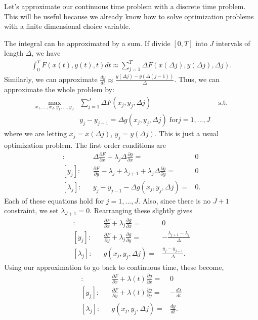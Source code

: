 Let's approximate our continuous time problem with a discrete time
problem. This will be useful because we already know how to solve
optimization problems with a finite dimensional choice variable. 

The integral can be approximated by a sum. If divide $[0,T]$ into $J$
intervals of length $\Delta$, we have
\begin{align*}
  \int_0^T F(x(t),y(t),t) dt \approx \sum_{j=1}^T \Delta F(x(\Delta
  j), y(\Delta j) , \Delta j).
\end{align*}
Similarly, we can approximate $\frac{dy}{dt} \approx \frac{y(\Delta j)
  - y(\Delta(j-1))}{\Delta}$. 
Thus, we can approximate the whole problem by:
\begin{align*}
  \max_{x_1, ..., x_J, y_1, ..., y_J} & \sum_{j=1}^J \Delta F(x_j,
  y_j,\Delta j) 
  & \text{ s.t.} \\
  & y_j - y_{j-1} = \Delta g(x_j,y_j,\Delta j) \text{ for} j = 1,...,J
\end{align*}
where we are letting $x_j = x(\Delta j)$, $y_j = y(\Delta j)$. This is
just a usual optimization problem. The first order conditions are
\begin{align*}
  [x_j]: &&  \Delta \frac{\partial F}{\partial x} + \lambda_j \Delta
  \frac{\partial g}{\partial x} = & 0 \\
  [y_j]: &&  \frac{\partial F}{\partial y} - \lambda_j + \lambda_{j+1}
  + \lambda_j \Delta
  \frac{\partial g}{\partial y} = & 0 \\
  [\lambda_j]: && y_j - y_{j-1} - \Delta g(x_j,y_j,\Delta j) = & 0 .
\end{align*}
Each of these equations hold for $j = 1,..., J$. Also, since there is
no $J+1$ constraint, we set $\lambda_{J+1}=0$. Rearranging these
slightly gives
\begin{align*}
  [x_j]: &&  \frac{\partial F}{\partial x} + \lambda_j \frac{\partial
    g}{\partial x} = & 0 \\ 
  [y_j]: &&  \frac{\partial F}{\partial y} + \lambda_j 
  \frac{\partial g}{\partial y} = & -\frac{\lambda_{j+1} -
    \lambda_j}{\Delta} \\
  [\lambda_j]: && g(x_j,y_j,\Delta j) = & \frac{y_j - y_{j-1}}{\Delta}.
\end{align*}
Using our approximation to go back to continuous time, these become,
\begin{align*}
  [x_j]: &&  \frac{\partial F}{\partial x} + \lambda(t) \frac{\partial
    g}{\partial x} = & 0 \\ 
  [y_j]: &&  \frac{\partial F}{\partial y} + \lambda(t)
  \frac{\partial g}{\partial y} = & -\frac{d\lambda}{dt} \\ 
  [\lambda_j]: && g(x_j,y_j,\Delta j) = & \frac{dy}{dt}. 
\end{align*}
